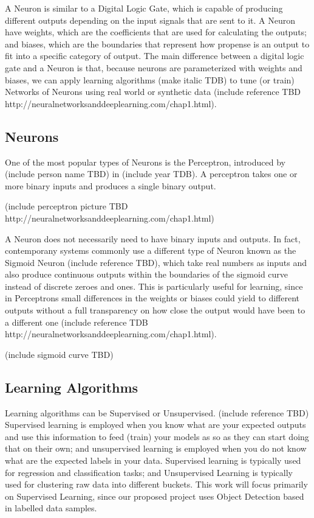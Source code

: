 \documentclass[openright]{normas-utf-tex} %
\begin{document}
A Neuron is similar to a Digital Logic Gate, which is capable of producing 
different outputs depending on the input signals that are sent to it.
A Neuron have weights, which are the coefficients that are used for calculating
the outputs; and biases, which are the boundaries that represent how propense is an output
to fit into a specific category of output. 
The main difference between a digital logic gate and a Neuron is that, because neurons are
parameterized with weights and biases, we can apply learning algorithms (make italic TDB) 
to tune (or train) Networks of Neurons using real world or synthetic data (include reference TBD http://neuralnetworksanddeeplearning.com/chap1.html).

\subsection{Neurons}

One of the most popular types of Neurons is the Perceptron, introduced by 
(include person name TBD) in (include year TDB). 
A perceptron takes one or more binary inputs and produces a single binary output.

(include perceptron picture TBD http://neuralnetworksanddeeplearning.com/chap1.html)

A Neuron does not necessarily need to have binary inputs and outputs. In fact, 
contemporany systems commonly use a different type of Neuron known as the Sigmoid Neuron
(include reference TBD), which take real numbers as inputs and also produce continuous outputs 
within the boundaries of the sigmoid curve instead of discrete zeroes and ones. 
This is particularly useful for learning, since in Perceptrons small differences in the 
weights or biases could yield to different outputs without a full transparency 
on how close the output would have been to a different one 
(include reference TDB http://neuralnetworksanddeeplearning.com/chap1.html).

(include sigmoid curve TBD)

\subsection{Learning Algorithms}

Learning algorithms can be Supervised or Unsupervised. (include reference TBD)
Supervised learning is employed when you know what are your expected outputs and use this
information to feed (train) your models as so as they can start doing that on their own; 
and unsupervised learning is employed when you do not know what are the expected labels 
in your data. Supervised learning is typically used for regression and classification tasks; 
and Unsupervised Learning is typically used for clustering raw data into different buckets. 
This work will focus primarily on Supervised Learning, since our proposed project uses
Object Detection based in labelled data samples.
\end{document}
